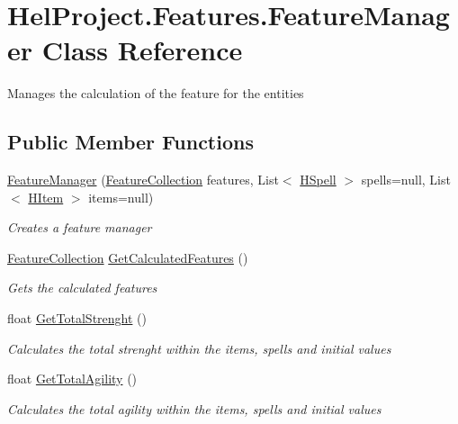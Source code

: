 \hypertarget{class_hel_project_1_1_features_1_1_feature_manager}{}\section{Hel\+Project.\+Features.\+Feature\+Manager Class Reference}
\label{class_hel_project_1_1_features_1_1_feature_manager}


Manages the calculation of the feature for the entities  


\subsection*{Public Member Functions}
\begin{DoxyCompactItemize}
\item 
\hyperlink{class_hel_project_1_1_features_1_1_feature_manager_aa0f53d0bac56de1cdb4fb36c0d56708b}{Feature\+Manager} (\hyperlink{class_hel_project_1_1_features_1_1_feature_collection}{Feature\+Collection} features, List$<$ \hyperlink{class_hel_project_1_1_game_world_1_1_spells_1_1_h_spell}{H\+Spell} $>$ spells=null, List$<$ \hyperlink{class_hel_project_1_1_game_world_1_1_h_item}{H\+Item} $>$ items=null)
\begin{DoxyCompactList}\small\item\em Creates a feature manager \end{DoxyCompactList}\item 
\hyperlink{class_hel_project_1_1_features_1_1_feature_collection}{Feature\+Collection} \hyperlink{class_hel_project_1_1_features_1_1_feature_manager_aaa192e040c25fefa91e5d6abd99625c0}{Get\+Calculated\+Features} ()
\begin{DoxyCompactList}\small\item\em Gets the calculated features \end{DoxyCompactList}\item 
float \hyperlink{class_hel_project_1_1_features_1_1_feature_manager_a84f16b535f2140f2255202deaab08db6}{Get\+Total\+Strenght} ()
\begin{DoxyCompactList}\small\item\em Calculates the total strenght within the items, spells and initial values \end{DoxyCompactList}\item 
float \hyperlink{class_hel_project_1_1_features_1_1_feature_manager_ac90f3988658e1b3976e75e430bb6e4c5}{Get\+Total\+Agility} ()
\begin{DoxyCompactList}\small\item\em Calculates the total agility within the items, spells and initial values \end{DoxyCompactList}\item 

\end{DoxyCompactItemize}
